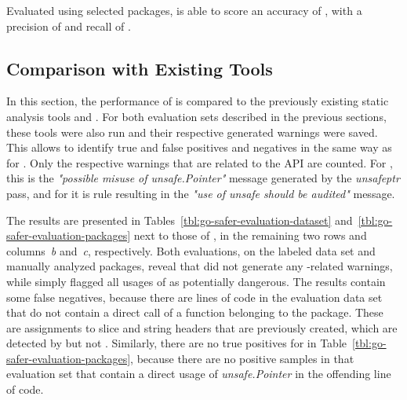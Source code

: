 \begin{hero}
    Evaluated using  selected packages, \toolSafer{} is able to score an accuracy of , with
    a precision of  and recall of .
\end{hero}



\subsection{Comparison with Existing Tools}\label{subsec:go-safer:evaluation:linters-comparison}

In this section, the performance of \toolSafer{} is compared to the previously existing static analysis tools \toolVet{}
and \toolGosec{}.
For both evaluation sets described in the previous sections, these tools were also run and their respective generated
warnings were saved.
This allows to identify true and false positives and negatives in the same way as for \toolSafer{}.
Only the respective warnings that are related to the \unsafe{} \acrshort{API} are counted.
For \toolVet{}, this is the \textit{"possible misuse of unsafe.Pointer"} message generated by the \textit{unsafeptr}
pass, and for \toolGosec{} it is rule  resulting in the \textit{"use of unsafe should be
audited"} message.

The results are presented in Tables~\ref{tbl:go-safer-evaluation-dataset} and~\ref{tbl:go-safer-evaluation-packages}
next to those of \toolSafer{}, in the remaining two rows and columns~\textit{b} and~\textit{c}, respectively.
Both evaluations, on the labeled data set and  manually analyzed packages, reveal that \toolVet{} did not
generate any \unsafe{}-related warnings, while \toolGosec{} simply flagged all usages of \unsafe{} as potentially
dangerous.
The \toolGosec{} results contain some false negatives, because there are lines of code in the evaluation data set that
do not contain a direct call of a function belonging to the \unsafe{} package.
These are assignments to slice and string headers that are previously created, which are detected by \toolSafer{} but
not \toolGosec{}.
Similarly, there are no true positives for \toolGosec{} in Table~\ref{tbl:go-safer-evaluation-packages}, because there
are no positive samples in that evaluation set that contain a direct usage of \textit{unsafe.Pointer} in the offending
line of code.

